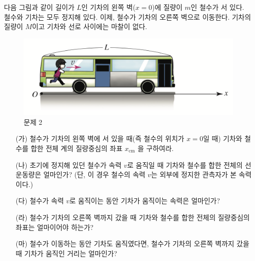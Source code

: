\documentclass[floatfix,nofootinbib,superscriptaddress,fleqn]{revtex4-2}
\begin{document}
다음 그림과 같이 길이가 $L$인 기차의 왼쪽 벽($x=0$)에 질량이 $m$인 
철수가 서 있다. 철수와 기차는 모두 정지해 있다. 이제, 철수가 기차의
오른쪽 벽으로 이동한다. 기차의 질량이 $M$이고 기차와 선로 사이에는
마찰이 없다. 
\begin{figure}[htp]
  \centering
\includegraphics[scale=0.5]{Qfig12-2-20210409.png}  
  \caption{문제 2}
  \label{fig:2}
\end{figure}

\begin{itemize}
\item[(가)] 철수가 기차의 왼쪽 벽에 서 있을 때(즉 철수의 위치가
  $x=0$일 때) 기차와 철수를 합한 전체 계의 질량중심의 좌표
  $x_{\mathrm{cm}}$ 을 구하여라. 
\item[(나)] 초기에 정지해 있던 철수가 속력 $v$로 움직일 때 기차와
  철수를 합한 전체의 선운동량은 얼마인가? (단, 이 경우 철수의 속력
  $v$는 외부에 정지한 관측자가 본 속력이다.) 
\item[(다)] 철수가 속력 $v$로 움직이는 동안 기차가 움직이는 속력은
  얼마인가? 
\item[(라)] 철수가 기차의 오른쪽 벽까지 갔을 때 기차와 철수를 합한
  전체의 질량중심의 좌표는 얼마이어야 하는가?
\item[(마)] 철수가 이동하는 동안 기차도 움직였다면, 철수가 기차의
  오른쪽 벽까지 갔을 때 기차가 움직인 거리는 얼마인가?
\end{itemize}
\end{document}
